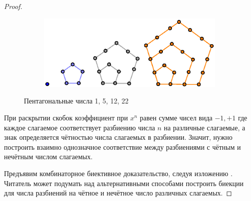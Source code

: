 \documentclass[a5paper]{article}
\theoremstyle{definition}
\begin{document}
\begin{proof}
\begin{figure}[h]
\centering
\begin{subfigure}{.8\textwidth}
	\centering
	\includegraphics[width=.7\textwidth]{pentagonal}
\end{subfigure}%
\caption{Пентагональные числа 1, 5, 12, 22}
\label{fig:pentagonal}	
\end{figure}
	При раскрытии скобок коэффициент при \( x^n \) равен сумме чисел вида \( 
	-1, +1 \) где каждое слагаемое соответствует разбиению числа \( n \) на 
	различные слагаемые, а знак определяется чётностью числа слагаемых в 
	разбиении. Значит, нужно построить взаимно однозначное соответствие между 
	разбиениями с чётным и нечётным числом слагаемых.
	
	Предъявим комбинаторное биективное доказательство, следуя изложению 
	\cite[Proposition 1.8.7]{stanley1}. Читатель может подумать над 
	альтернативными способами построить биекции для числа разбиений на чётное и 
	нечётное число различных слагаемых.
	

\end{proof}
\end{document}
